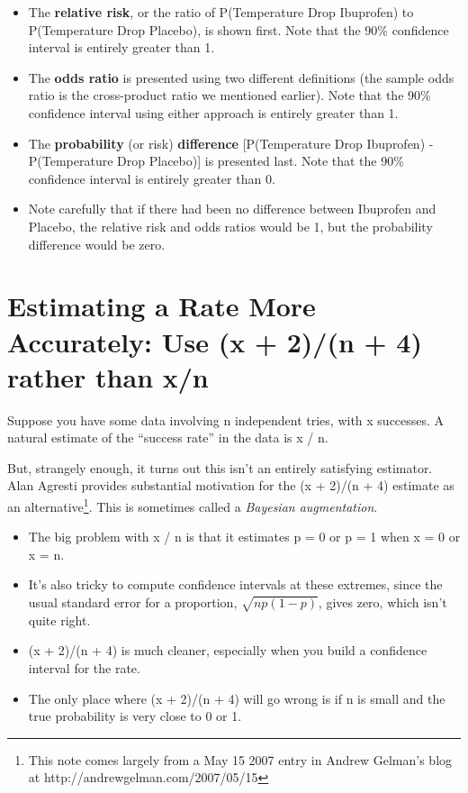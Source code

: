 \documentclass[
]{book}
\providecommand{\tightlist}{%
  \setlength{\itemsep}{0pt}\setlength{\parskip}{0pt}}
\begin{document}
\begin{itemize}
\tightlist
\item
  The \textbf{relative risk}, or the ratio of P(Temperature Drop \textbar{} Ibuprofen) to P(Temperature Drop \textbar{} Placebo), is shown first. Note that the 90\% confidence interval is entirely greater than 1.
\item
  The \textbf{odds ratio} is presented using two different definitions (the sample odds ratio is the cross-product ratio we mentioned earlier). Note that the 90\% confidence interval using either approach is entirely greater than 1.
\item
  The \textbf{probability} (or risk) \textbf{difference} {[}P(Temperature Drop \textbar{} Ibuprofen) - P(Temperature Drop \textbar{} Placebo){]} is presented last. Note that the 90\% confidence interval is entirely greater than 0.
\item
  Note carefully that if there had been no difference between Ibuprofen and Placebo, the relative risk and odds ratios would be 1, but the probability difference would be zero.
\end{itemize}

\hypertarget{estimating-a-rate-more-accurately-use-x-2n-4-rather-than-xn}{%
\section{Estimating a Rate More Accurately: Use (x + 2)/(n + 4) rather than x/n}\label{estimating-a-rate-more-accurately-use-x-2n-4-rather-than-xn}}

Suppose you have some data involving n independent tries, with x successes. A natural estimate of the ``success rate'' in the data is x / n.~

But, strangely enough, it turns out this isn't an entirely satisfying estimator. Alan Agresti provides substantial motivation for the (x + 2)/(n + 4) estimate as an alternative\footnote{This note comes largely from a May 15 2007 entry in Andrew Gelman's blog at http://andrewgelman.com/2007/05/15}. This is sometimes called a \emph{Bayesian augmentation}.

\begin{itemize}
\tightlist
\item
  The big problem with x / n is that it estimates p = 0 or p = 1 when x = 0 or x = n.~
\item
  It's also tricky to compute confidence intervals at these extremes, since the usual standard error for a proportion, \(\sqrt{n p (1-p)}\), gives zero, which isn't quite right.
\item
  (x + 2)/(n + 4) is much cleaner, especially when you build a confidence interval for the rate.
\item
  The only place where (x + 2)/(n + 4) will go wrong is if n is small and the true probability is very close to 0 or 1.
\end{itemize}
\end{document}
